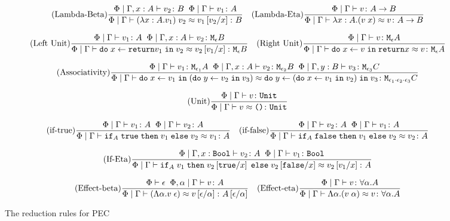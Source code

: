 \documentclass{Report}
\begin{document}
\begin{figure}[h!]
    \[
        \treerule{Lambda-Beta}{\etyperelation{\P}{\gax}{v_2}{B}\s\s \gpetyperelation{v_1}{A}}{\gpeberelation{\apply{(\lam{x}{A}{v_1})}{v_2} }{ v_1\ssub{x}{v_2}}{B}}
        \quad
        \treerule{Lambda-Eta}{\gpetyperelation{v}{\ab}}{\gpeberelation{\lam{x}{A}{(\apply{v}{x}})}{v}{\ab}}
    \]

    \[
        \treerule{Left Unit}{\gpetyperelation{v_1}{A} \s\s \etyperelation{\P}{\gax}{v_2}{\meb}}{\gpeberelation{\doin{x}{\return{v_1}}{v_2}}{v_2\ssub{x}{v_1}}{\meb}}
        \quad
        \treerule{Right Unit}{\gpetyperelation{v}{\mea}}{\gpeberelation{\doin{x}{v}{\return{x}} }{v}{\mea}}
    \]

    \[
        \treerule{Associativity}{\gpetyperelation{v_1}{\M{\e_1}{A}} \s\s \etyperelation{\P}{\gax}{v_2}{\M{\e_2}{B}}\s\s \etyperelation{\P}{\gby}{v_3}{\M{\e_3}{C}}}{
            \gpeberelation{\doin{x}{v_1}{(\doin{y}{v_2}{v_3})}}{\doin{y}{(\doin{x}{v_1}{v_2})}{v_3}}{\M{\e_1 \dot \e_2 \dot \e_3}{C}}
        }
    \]

    \[
        \treerule{Unit}{\gpetyperelation{v}{\U}}{\gpeberelation{v}{\u}{\U}}
    \]

    \[
        \treerule{if-true}{\gpetyperelation{v_1}{A}\s\s\gpetyperelation{v_2}{A}}{\gpeberelation{\pifthenelse{A}{\t}{v_1}{v_2}}{v_1}{A}}
        \quad
        \treerule{if-false}{\gpetyperelation{v_2}{A}\s\s\gpetyperelation{v_1}{A}}{\gpeberelation{\pifthenelse{A}{\f}{v_1}{v_2}}{v_2}{A}}    
    \]

    \[
        \treerule{If-Eta}{\etyperelation{\P}{\G, x: \B}{v_2}{A}\s\s\gpetyperelation{v_1}{\B}}{\gpeberelation{\pifthenelse{A}{v_1}{v_2\ssub{x}{\t}}{v_2\ssub{x}{\f}}}{v_2\ssub{x}{v_1}}{A}}
    \]

    \[
        \treerule{Effect-beta}{\wellformed{\P}{\e}\s\s\etyperelation{\P, \a}{\G}{v}{A}}{\gpeberelation{\eapp{(\elam{\a}{v}}{\e})}{v\ssub{\a}{\e}}{A\ssub{\a}{\e}}}
        \quad 
        \treerule{Effect-eta}{\etyperelation{\P}{\G}{v}{\all{\a}{A}}}{\gpeberelation{\elam{\a}{(\eapp{v}{\a})}}{v}{\all{\a}{A}}}
    \]
    \caption{The reduction rules for PEC}
    \label{BetaEtaReductions}
\end{figure}
\end{document}
